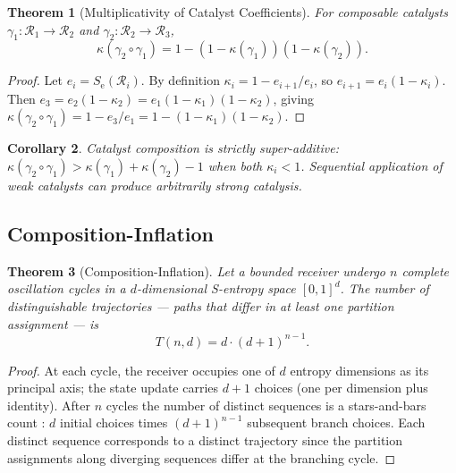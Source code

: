\documentclass[twocolumn,11pt,a4paper]{article}
\theoremstyle{plain}
\newtheorem{theorem}{Theorem}[section]
\newtheorem{corollary}[theorem]{Corollary}
\theoremstyle{definition}
\theoremstyle{remark}
\newcommand{\Se}{S_{\mathrm{e}}}
\begin{document}
\begin{theorem}[Multiplicativity of Catalyst Coefficients]
\label{thm:catalyst_mult}
For composable catalysts $\gamma_1 : \mathcal{R}_1 \to \mathcal{R}_2$ and $\gamma_2 : \mathcal{R}_2 \to \mathcal{R}_3$,
\begin{equation}
  \kappa(\gamma_2 \circ \gamma_1) = 1 - (1-\kappa(\gamma_1))(1-\kappa(\gamma_2)).
  \label{eq:catalyst_mult}
\end{equation}
\end{theorem}

\begin{proof}
Let $e_i = \Se(\mathcal{R}_i)$.  By definition $\kappa_i = 1 - e_{i+1}/e_i$, so $e_{i+1} = e_i(1-\kappa_i)$.  Then
$e_3 = e_2(1-\kappa_2) = e_1(1-\kappa_1)(1-\kappa_2)$, giving
$\kappa(\gamma_2\circ\gamma_1) = 1 - e_3/e_1 = 1-(1-\kappa_1)(1-\kappa_2)$.
\end{proof}

\begin{corollary}
Catalyst composition is strictly super-additive: $\kappa(\gamma_2\circ\gamma_1) > \kappa(\gamma_1) + \kappa(\gamma_2) - 1$ when both $\kappa_i < 1$.  Sequential application of weak catalysts can produce arbitrarily strong catalysis.
\end{corollary}

\subsection{Composition-Inflation}

\begin{theorem}[Composition-Inflation]
\label{thm:inflation}
Let a bounded receiver undergo $n$ complete oscillation cycles in a $d$-dimensional S-entropy space $[0,1]^d$.  The number of \emph{distinguishable trajectories} — paths that differ in at least one partition assignment — is
\begin{equation}
  T(n,d) = d\cdot(d+1)^{n-1}.
  \label{eq:inflation}
\end{equation}
\end{theorem}

\begin{proof}
At each cycle, the receiver occupies one of $d$ entropy dimensions as its principal axis; the state update carries $d+1$ choices (one per dimension plus identity).  After $n$ cycles the number of distinct sequences is a stars-and-bars count \citep{stanley2011,heubach2009}: $d$ initial choices times $(d+1)^{n-1}$ subsequent branch choices.  Each distinct sequence corresponds to a distinct trajectory since the partition assignments along diverging sequences differ at the branching cycle.
\end{proof}
\end{document}
